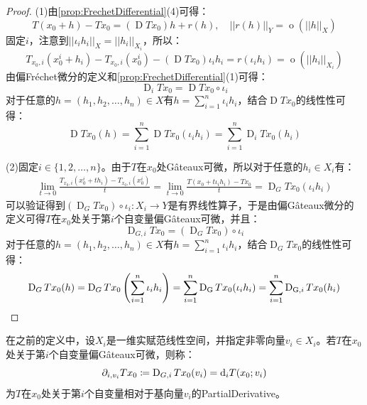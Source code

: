 \begin{proof}
	(1)由\cref{prop:FrechetDifferential}(4)可得：
	\begin{equation*}
		T(x_0+h)-Tx_0=(\operatorname{D}Tx_0)h+r(h),\quad||r(h)||_Y=\operatorname{o}(||h||_X)
	\end{equation*}
	固定$i$，注意到$||\iota_ih_i||_X=||h_i||_{X_i}$，所以：
	\begin{equation*}
		T_{x_0,i}(x_0^i+h_i)-T_{x_0,i}(x_0^i)-(\operatorname{D}Tx_0)\iota_ih_i=r(\iota_ih_i)=\operatorname{o}(||h_i||_{X_i})
	\end{equation*}
	由偏Fr\'echet微分的定义和\cref{prop:FrechetDifferential}(1)可得：
	\begin{equation*}
		\operatorname{D}_iTx_0=\operatorname{D}Tx_0\circ\iota_i
	\end{equation*}
	对于任意的$h=(h_1,h_2,\dots,h_n)\in X$有$h=\sum\limits_{i=1}^{n}\iota_ih_i$，结合$\operatorname{D}Tx_0$的线性性可得：
	\begin{equation*}
		\operatorname{D}Tx_0(h)=\sum_{i=1}^{n}\operatorname{D}Tx_0(\iota_ih_i)=\sum_{i=1}^{n}\operatorname{D}_iTx_0(h_i)
	\end{equation*}\par
	(2)固定$i\in\{1,2,\dots,n\}$。由于$T$在$x_0$处G\^ateaux可微，所以对于任意的$h_i\in X_i$有：
	\begin{align*}
		\lim_{t\to0}\frac{T_{x_0,i}(x_0^i+th_i)-T_{x_0,i}(x_0^i)}{t}=\lim_{t\to0}\frac{T(x_0+t\iota_ih_i)-Tx_0}{t}=\operatorname{D}_{G}Tx_0(\iota_ih_i)
	\end{align*}
	可以验证得到$(\operatorname{D}_{G}Tx_0)\circ\iota_i:X_i\to Y$是有界线性算子，于是由偏G\^ateaux微分的定义可得$T$在$x_0$处关于第$i$个自变量偏G\^ateaux可微，并且：
	\begin{equation*}
		\operatorname{D}_{G,i}Tx_0=(\operatorname{D}_{G}Tx_0)\circ\iota_i
	\end{equation*}
	对于任意的$h=(h_1,h_2,\dots,h_n)\in X$有$h=\sum\limits_{i=1}^{n}\iota_ih_i$，结合$\operatorname{D}_{G}Tx_0$的线性性可得：
	\begin{equation*}
		\operatorname{D}_{G}Tx_0(h)=\operatorname{D}_{G}Tx_0\left(\sum_{i=1}^{n}\iota_ih_i\right)=\sum_{i=1}^{n}\operatorname{D}_{\mathrm{G}}Tx_0(\iota_ih_i)=\sum_{i=1}^{n}\operatorname{D}_{\mathrm{G},i}Tx_0(h_i)\qedhere
	\end{equation*}
\end{proof}
\begin{definition}
	在之前的定义中，设$X_i$是一维实赋范线性空间，并指定非零向量$v_i\in X_i$。若$T$在$x_0$处关于第$i$个自变量偏G\^ateaux可微，则称：
	\begin{equation*}
		\partial_{i,v_i}Tx_0\coloneq\operatorname{D}_{G,i}Tx_0(v_i)=\mathop{}\!\mathrm{d}_iT(x_0;v_i)
	\end{equation*}
	为$T$在$x_0$处关于第$i$个自变量相对于基向量$v_i$的\gls{PartialDerivative}。
\end{definition}
